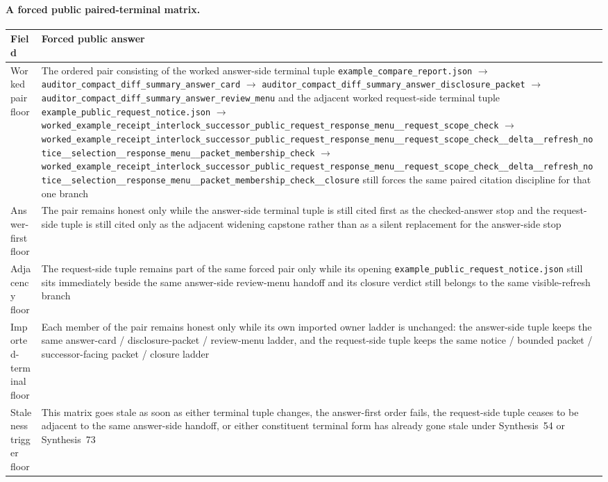 \documentclass[11pt]{article}
\begin{document}
\paragraph{A forced public paired-terminal matrix.}
\begin{table}[t]
\centering
\small
\begin{tabularx}{\linewidth}{@{}LY@{}}
\toprule
Field & Forced public answer \\
\midrule
Worked pair floor & The ordered pair consisting of the worked answer-side terminal tuple \nolinkurl{example_compare_report.json} $\to$ \nolinkurl{auditor_compact_diff_summary_answer_card} $\to$ \nolinkurl{auditor_compact_diff_summary_answer_disclosure_packet} $\to$ \nolinkurl{auditor_compact_diff_summary_answer_review_menu} and the adjacent worked request-side terminal tuple \nolinkurl{example_public_request_notice.json} $\to$ \nolinkurl{worked_example_receipt_interlock_successor_public_request_response_menu__request_scope_check} $\to$ \nolinkurl{worked_example_receipt_interlock_successor_public_request_response_menu__request_scope_check__delta__refresh_notice__selection__response_menu__packet_membership_check} $\to$ \nolinkurl{worked_example_receipt_interlock_successor_public_request_response_menu__request_scope_check__delta__refresh_notice__selection__response_menu__packet_membership_check__closure} still forces the same paired citation discipline for that one branch \\
Answer-first floor & The pair remains honest only while the answer-side terminal tuple is still cited first as the checked-answer stop and the request-side tuple is still cited only as the adjacent widening capstone rather than as a silent replacement for the answer-side stop \\
Adjacency floor & The request-side tuple remains part of the same forced pair only while its opening \nolinkurl{example_public_request_notice.json} still sits immediately beside the same answer-side review-menu handoff and its closure verdict still belongs to the same visible-refresh branch \\
Imported-terminal floor & Each member of the pair remains honest only while its own imported owner ladder is unchanged: the answer-side tuple keeps the same answer-card / disclosure-packet / review-menu ladder, and the request-side tuple keeps the same notice / bounded packet / successor-facing packet / closure ladder \\
Staleness trigger floor & This matrix goes stale as soon as either terminal tuple changes, the answer-first order fails, the request-side tuple ceases to be adjacent to the same answer-side handoff, or either constituent terminal form has already gone stale under Synthesis~54 or Synthesis~73 \\

\end{tabularx}
\end{table}
\end{document}

